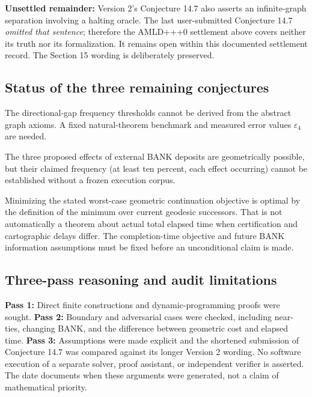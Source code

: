\documentclass[11pt]{article}
\theoremstyle{definition}
\theoremstyle{remark}
\newcommand{\eps}{\varepsilon}
\begin{document}
\textbf{Unsettled remainder:} Version 2's Conjecture 14.7 also asserts an infinite-graph separation involving a halting oracle. The last user-submitted Conjecture 14.7 \emph{omitted that sentence}; therefore the AMLD+++0 settlement above covers neither its truth nor its formalization. It remains open within this documented settlement record. The Section 15 wording is deliberately preserved.

\subsection*{Status of the three remaining conjectures}
\begin{description}[style=nextline,leftmargin=2em,itemsep=.5em]
\item[14.2 --- Unknown (empirical).] The directional-gap frequency thresholds cannot be derived from the abstract graph axioms. A fixed natural-theorem benchmark and measured error values $\eps_4$ are needed.
\item[14.3 --- Unknown (empirical).] The three proposed effects of external BANK deposits are geometrically possible, but their claimed frequency (at least ten percent, each effect occurring) cannot be established without a frozen execution corpus.
\item[14.5 --- Cost-model dependent.] Minimizing the stated worst-case geometric continuation objective is optimal by the definition of the minimum over current geodesic successors. That is not automatically a theorem about actual total elapsed time when certification and cartographic delays differ. The completion-time objective and future BANK information assumptions must be fixed before an unconditional claim is made.
\end{description}

\subsection*{Three-pass reasoning and audit limitations}
\textbf{Pass 1:} Direct finite constructions and dynamic-programming proofs were sought. 
\textbf{Pass 2:} Boundary and adversarial cases were checked, including near-ties, changing BANK, and the difference between geometric cost and elapsed time. 
\textbf{Pass 3:} Assumptions were made explicit and the shortened submission of Conjecture 14.7 was compared against its longer Version 2 wording. No software execution of a separate solver, proof assistant, or independent verifier is asserted. The date documents when these arguments were generated, not a claim of mathematical priority.
\end{document}
